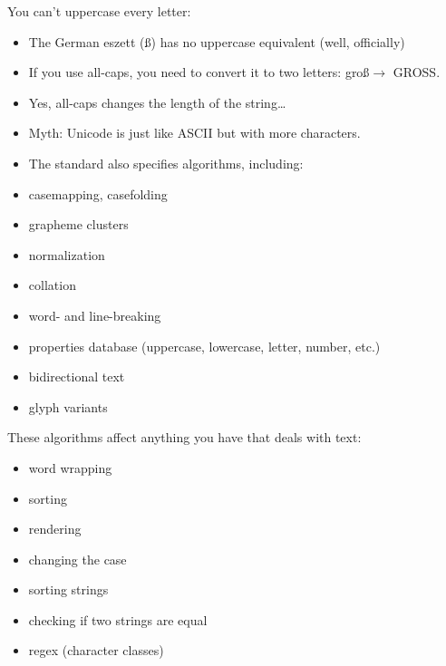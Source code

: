 \documentclass[%
        hyperref={%
                pdfauthor={Zakariyya Mughal},%
                pdfpagemode={None},pdfpagelayout={SinglePage}}%
        xcolor={x11names},%
]{beamer}
\begin{document}
\begin{frame}
You can't uppercase every letter:
\begin{itemize}
\item The German eszett (\ss) has no uppercase equivalent (well, officially)
\item If you use all-caps, you need to convert it to two letters:
gro\ss $\rightarrow$ GROSS.

\pause\item Yes, all-caps changes the length of the string\ldots
\end{itemize}
\end{frame}

\begin{frame}
\begin{itemize}
\item Myth: Unicode is just like ASCII but with more characters.
\item The standard also specifies algorithms, including:
\end{itemize}
\end{frame}


\begin{frame}
\begin{itemize}
\item casemapping, casefolding
\item grapheme clusters
\item normalization
\item collation
\item word- and line-breaking
\item properties database (uppercase, lowercase, letter, number, etc.)
\item bidirectional text
\item glyph variants
\end{itemize}
\end{frame}

\begin{frame}
These algorithms affect anything you have that deals with text:
\begin{itemize}
\item word wrapping
\item sorting
\item rendering
\item changing the case
\item sorting strings
\item checking if two strings are equal
\item regex (character classes)
\end{itemize}
\end{frame}
\end{document}
